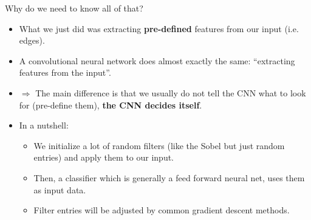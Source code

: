 {    \begin{itemize}

\end{itemize}
}

\begin{vbframe}{Why do we need to know all of that?}
  \begin{itemize}
    \item What we just did was extracting \textbf{pre-defined} features from our input (i.e. edges).
    \item A convolutional neural network does almost exactly the same: \enquote{extracting features from the input}.
    \item[] $\Rightarrow$ The main difference is that we usually do not tell the CNN what to look for (pre-define them), \textbf{the CNN decides itself}.
    \item In a nutshell:
    \begin{itemize}
      \item We initialize a lot of random filters (like the Sobel but just random entries) and apply them to our input.
      \item Then, a classifier which is generally a feed forward neural net, uses them as input data.
      \item Filter entries will be adjusted by common gradient descent methods.
    \end{itemize}
  \end{itemize}
\end{vbframe}

